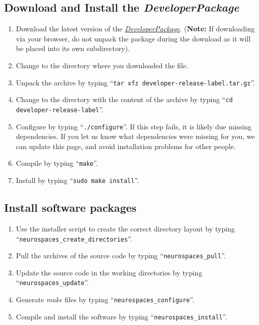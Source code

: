 \documentclass[12pt]{article}
\begin{document}
\subsection*{Download and Install the {\it DeveloperPackage}}

\begin{enumerate}
   \item Download the latest version of the \href{https://github.com/HugoCornelis/developer/blob/master/developer-0.0.0-alpha.tar.gz?raw=true}{{\it DeveloperPackage}}.  ({\bf Note:} If downloading via your browser, do not unpack the package during the download as it will be placed into its own subdirectory).
   \item Change to the directory where you downloaded the file.
   \item Unpack the archive by typing ``{\tt tar xfz developer-release-label.tar.gz}''.
   \item Change to the directory with the content of the archive by typing ``{\tt cd developer-release-label}''.
   \item Configure by typing ``{\tt ./configure}''.  If this step fails, it is likely due missing dependencies.  If you let us know what dependencies were missing for you, we can update this page, and avoid installation problems for other people.
   \item Compile by typing ``{\tt make}''.
   \item Install by typing ``{\tt sudo make install}''. 
\end{enumerate}

\subsection*{Install software packages}

\begin{enumerate}
   \item Use the installer script to create the correct directory layout by typing ``{\tt neurospaces\_create\_directories}''.
   \item Pull the archives of the source code by typing ``{\tt neurospaces\_pull}''.
   \item Update the source code in the working directories by typing ``{\tt neurospaces\_update}''.
   \item Generate {\it make} files by typing ``{\tt neurospaces\_configure}''.
   \item Compile and install the software by typing ``{\tt neurospaces\_install}''.
\end{enumerate}
\end{document}

